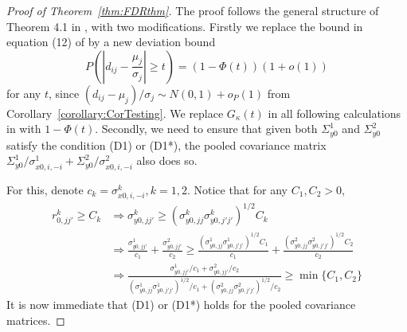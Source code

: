 \begin{proof}[Proof of Theorem~\ref{thm:FDRthm}]
The proof follows the general structure of Theorem 4.1 in \cite{LiuShao14}, with two modifications. Firstly we replace the bound in equation (12) of \cite{LiuShao14} by a new deviation bound
%
$$
P \left( \left| d_{ij} - \frac{\mu_j}{\sigma_j} \right| \geq t \right) = (1 - \Phi(t))(1 + o(1))
$$
%
for any $t$, since $(d_{ij} - \mu_j)/\sigma_j \sim N(0,1) + o_P(1)$ from Corollary~\ref{corollary:CorTesting}. We replace $G_\kappa(t)$ in all following calculations in \cite{LiuShao14} with $1 - \Phi(t)$. Secondly, we need to ensure that given both $\Sigma_{y0}^1$ and $\Sigma_{y0}^2$ satisfy the condition (D1) or (D1*), the pooled covariance matrix $\Sigma_{y0}^1/ \sigma_{x0,i,-i}^1 + \Sigma_{y0}^2/  \sigma_{x0,i,-i}^2$ also does so.

For this, denote $c_k =  \sigma_{x0,i,-i}^k, k = 1,2$. Notice that for any $C_1, C_2 > 0$,
%
\begin{align*}
r_{0,jj'}^k \geq C_k & \Rightarrow \sigma_{y0,jj'}^k \geq (\sigma_{y0,jj}^k \sigma_{y0,j'j'}^k)^{1/2} C_k\\
& \Rightarrow \frac{\sigma_{y0,jj'}^1}{c_1} + \frac{\sigma_{y0,jj'}^2}{c_2} \geq
\frac{ (\sigma_{y0,jj}^1 \sigma_{y0,j'j'}^1)^{1/2} C_1}{c_1} +
\frac{ (\sigma_{y0,jj}^2 \sigma_{y0,j'j'}^2)^{1/2} C_2}{c_2}\\
& \Rightarrow \frac{ \sigma_{y0,jj'}^1/c_1 + \sigma_{y0,jj'}^2/c_2}
{ (\sigma_{y0,jj}^1 \sigma_{y0,j'j'}^1)^{1/2}/ c_1 + (\sigma_{y0,jj}^2 \sigma_{y0,j'j'}^2)^{1/2}/ c_2}
\geq \min \{ C_1, C_2 \}
\end{align*}
%
It is now immediate that (D1) or (D1*) holds for the pooled covariance matrices.
\end{proof}


